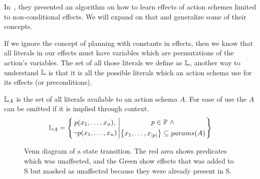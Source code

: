 \documentclass[../Master.tex]{subfiles}
\begin{document}
In~\cite{Walsh2008}, they presented an algorithm on how to learn effects of action schemes limited to non-conditional effects. We will expand on that and generalize some of their concepts.

If we ignore the concept of planning with constants in effects, then we know that all literals in our effects must have variables which are permutations of the action's variables. The set of all those literals we define as $\mathbb{L}$, another way to understand $\mathbb{L}$ is that it is all the possible literals which an action schema use for its effects (or preconditions).

\begin{definition} 
$\mathbb{L}_A$ is the set of all literals available to an action schema $A$. For ease of use the $A$ can be omitted if it is implied through context.
	\begin{equation*}
		\mathbb{L}_A = \left\{ 
				\begin{gathered}
					p(x_1,\dots,x_n), \\
					\neg p(x_1,\dots,x_n)
				\end{gathered}
					\left|
				\begin{gathered} p \in \mathbb{P}~\land \\
                    \left\{ x_1,\dots,x_{|p|} \right\} \subseteq params(A)
				\end{gathered}				
							\right.\right\}
	\end{equation*}
\end{definition}


\begin{figure}
	\def\firstcircle{(0,0) circle (1.5cm)}
	\def\secondcircle{(0:2cm) circle (1.5cm)}
	\def\thirdcircle{(0:3.8cm) circle (2.9cm)}
	\centering
\caption{\label{fig:nca:venn-of-effects} Venn diagram of a state transition. The red area shows predicates which was unaffected, and the Green show effects that was added to S but masked as unaffected because they were already present in S.}

\end{figure}
\end{document}
